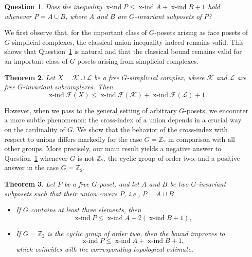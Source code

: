 \documentclass[preprint,12pt]{article}
\renewcommand{\le}{\leqslant}
\newtheorem{theorem}{Theorem}[section]
\newtheorem{question}[theorem]{Question}
\theoremstyle{definition}
\theoremstyle{remark}
\numberwithin{equation}{section}
\DeclareMathOperator{\xind}{x-ind}
\begin{document}
\begin{question}
\label{que: que1}
Does the inequality \( \xind P \le \xind A + \xind B + 1 \) hold whenever \(P = A \cup B\), where \(A\) and \(B\) are \(G\)-invariant subposets of \(P\)?
\end{question}

We first observe that, for the important class of \(G\)-posets arising as face posets of \(G\)-simplicial complexes, the classical union inequality indeed remains valid. This shows that Question~\ref{que: que1} is natural and that the classical
bound remains valid for an important class of \(G\)-posets arising from
simplicial complexes.

\begin{theorem}\label{Thm: union1}
Let \(X = \mathcal{K} \cup \mathcal{L}\) be a free \(G\)-simplicial complex, where \(\mathcal{K}\) and \(\mathcal{L}\) are free \(G\)-invariant subcomplexes. Then
\[
\xind \mathcal{F}(X) \le \xind \mathcal{F}(\mathcal{K}) + \xind \mathcal{F}(\mathcal{L}) + 1.
\]
\end{theorem}

However, when we pass to the general setting of arbitrary \(G\)-posets, we encounter a more subtle phenomenon: the cross-index of a union depends in a crucial way on the cardinality of \(G\). We show that the behavior of the cross-index with respect to unions differs markedly for the case \(G = \mathbb{Z}_2\) in comparison with all other groups. More precisely, our main result yields a negative answer to Question~\ref{que: que1} whenever \(G\) is not \(\mathbb{Z}_2\), the cyclic group of order two, and a positive answer in the case \(G = \mathbb{Z}_2\).




\begin{theorem}\label{Main:Theorem 1}
Let \(P\) be a free \(G\)-poset, and let \(A\) and \(B\) be two \(G\)-invariant subposets such that their union covers \(P\), i.e., \(P = A \cup B\).

\begin{itemize}
\item[(a)] If \(G\) contains at least three elements, then
\[
\xind P \le \xind A + 2(\xind B + 1),
\]
\item[(b)] If \(G = \mathbb{Z}_2\) is the cyclic group of order two, then the bound improves to
\[
\xind P \le \xind A + \xind B + 1,
\]
which coincides with the corresponding topological estimate.
\end{itemize}
\end{theorem}
\end{document}
